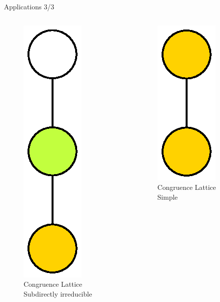 \begin{frame}{Applications 3/3}
\begin{columns}
\begin{column}{0.3\textwidth}
\begin{figure}[H]
    \centering
    \includegraphics[scale = 0.5]{Thesis/images/Coloured28_3LatticeGraph.eps}
    \caption{Congruence Lattice  \\ Subdirectly irreducible}
    \label{fig:my_label}
\end{figure}

\end{column}
\begin{column}{0.3\textwidth}

\begin{figure}[H]
    \centering
    \includegraphics[scale = 0.5]{Thesis/images/Coloured3_1LatticeGraph.eps}
    \caption{Congruence Lattice \\ Simple}
    \label{fig:my_label}
\end{figure}

\end{column}
\end{columns}
\end{frame}

